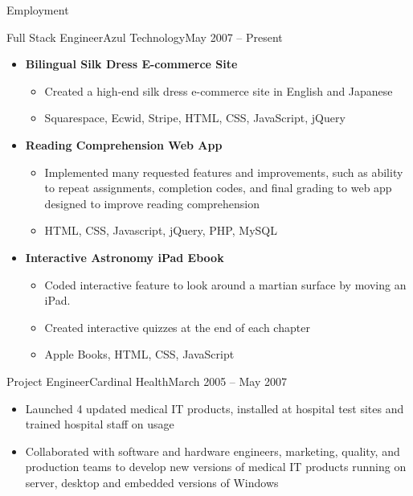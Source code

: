 \documentclass[calibri]{fullstack}
\begin{document}
\begin{cvsection}{Employment}
\begin{cvsubsection}{Full Stack Engineer}{Azul Technology}{May 2007 -- Present}
\begin{itemize}
				\item \textbf{Bilingual Silk Dress E-commerce Site} %
				\begin{itemize}
					\item Created a high-end silk dress e-commerce site in English and Japanese
					\item Squarespace, Ecwid, Stripe, HTML, CSS, JavaScript, jQuery
				\end{itemize}

				\item \textbf{Reading Comprehension Web App} %
				\begin{itemize}
					\item Implemented many requested features and improvements, such as ability to repeat assignments, completion codes, and final grading to web app designed to improve reading comprehension
					\item HTML, CSS, Javascript, jQuery, PHP, MySQL
				\end{itemize}

				\item \textbf{Interactive Astronomy iPad Ebook} %
				\begin{itemize}
					\item Coded interactive feature to look around a martian surface by moving an iPad.
					\item Created interactive quizzes at the end of each chapter
					\item Apple Books, HTML, CSS, JavaScript
				\end{itemize}

			\end{itemize}
		\end{cvsubsection}

		\begin{cvsubsection}{Project Engineer}{Cardinal Health}{March 2005 -- May 2007}
			\begin{itemize}
				\item Launched 4 updated medical IT products, installed at hospital test sites and trained hospital staff on usage
				\item Collaborated  with  software  and hardware  engineers,  marketing,  quality,  and  production teams to develop new versions of medical IT products running on server, desktop and embedded versions of Windows
			\end{itemize}
		\end{cvsubsection}


\end{cvsection}
\end{document}

